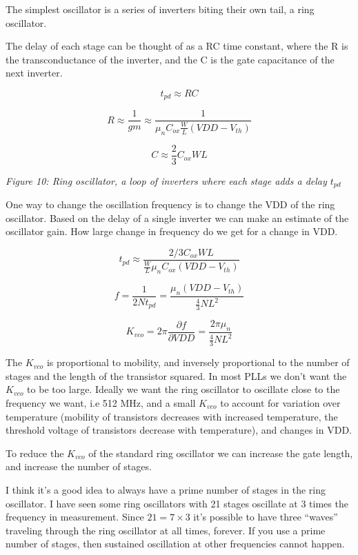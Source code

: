 The simplest oscillator is a series of inverters biting their own tail,
a ring oscillator.

The delay of each stage can be thought of as a RC time constant, where
the R is the transconductance of the inverter, and the C is the gate
capacitance of the next inverter.

\[ t_{pd} \approx R C \]

\[ R \approx \frac{1}{gm} \approx \frac{1}{\mu_n C_{ox} \frac{W}{L} (VDD - V_{th})}\]

\[ C \approx \frac{2}{3} C_{ox} W L\]


{
\centering
{}
}

\emph{Figure 10: Ring oscillator, a loop of inverters where each stage
adds a delay \(t_{pd}\)}

One way to change the oscillation frequency is to change the VDD of the
ring oscillator. Based on the delay of a single inverter we can make an
estimate of the oscillator gain. How large change in frequency do we get
for a change in VDD.

\[ t_{pd} \approx \frac{2/3 C_{ox} W L}{\frac{W}{L} \mu_n C_{ox}(VDD - V_{th})}\]

\[ f = \frac{1}{2 N t_{pd}} = \frac{\mu_n (VDD-V_{th})}{\frac{4}{3} N L^2}\]

\[ K_{vco} = 2 \pi \frac{\partial f}{\partial VDD} = \frac{2 \pi \mu_n}{\frac{4}{3} N L^2}\]

The \(K_{vco}\) is proportional to mobility, and inversely proportional
to the number of stages and the length of the transistor squared. In
most PLLs we don't want the \(K_{vco}\) to be too large. Ideally we want
the ring oscillator to oscillate close to the frequency we want, i.e 512
MHz, and a small \(K_{vco}\) to account for variation over temperature
(mobility of transistors decreases with increased temperature, the
threshold voltage of transistors decrease with temperature), and changes
in VDD.

To reduce the \(K_{vco}\) of the standard ring oscillator we can
increase the gate length, and increase the number of stages.

I think it's a good idea to always have a prime number of stages in the
ring oscillator. I have seen some ring oscillators with 21 stages
oscillate at 3 times the frequency in measurement. Since
\(21 = 7 \times 3\) it's possible to have three ``waves'' traveling
through the ring oscillator at all times, forever. If you use a prime
number of stages, then sustained oscillation at other frequencies cannot
happen.

